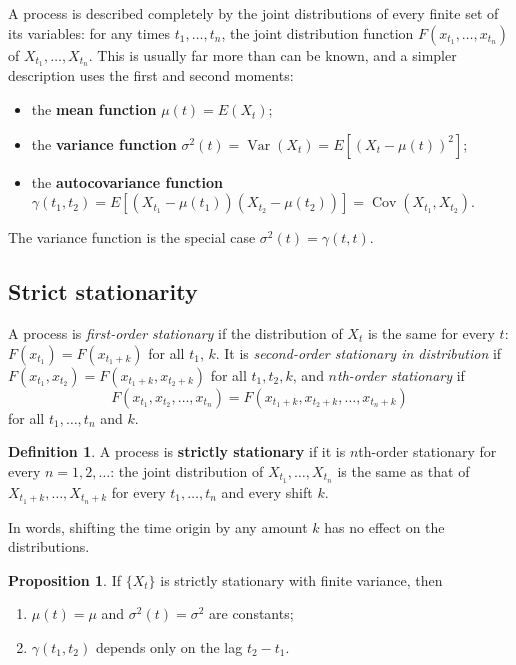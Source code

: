 \documentclass[11pt,a4paper]{article}
\theoremstyle{definition}
\newtheorem{defn}[thm]{Definition}
\newtheorem{prop}[thm]{Proposition}
\DeclareMathOperator{\Var}{Var}
\DeclareMathOperator{\Cov}{Cov}
\begin{document}
A process is described completely by the joint distributions of every finite set of its variables: for any
times $t_1, \dots, t_n$, the joint distribution function $F(x_{t_1}, \dots, x_{t_n})$ of $X_{t_1}, \dots, X_{t_n}$. This is usually far more than can be
known, and a simpler description uses the first and second moments:
\begin{itemize}
\item the \textbf{mean function} $\mu(t) = E(X_t)$;
\item the \textbf{variance function} $\sigma^2(t) = \Var(X_t) = E[(X_t - \mu(t))^2]$;
\item the \textbf{autocovariance function} $\gamma(t_1, t_2) = E[(X_{t_1} - \mu(t_1))(X_{t_2} - \mu(t_2))] = \Cov(X_{t_1}, X_{t_2})$.
\end{itemize}
The variance function is the special case $\sigma^2(t) = \gamma(t, t)$.

\subsection{Strict stationarity}
A process is \emph{first-order stationary} if the distribution of $X_t$ is the same for every $t$: $F(x_{t_1}) = F(x_{t_1+k})$ for all $t_1$, $k$. It is
\emph{second-order stationary in distribution} if $F(x_{t_1}, x_{t_2}) = F(x_{t_1+k}, x_{t_2+k})$ for all $t_1, t_2, k$, and \emph{$n$th-order stationary} if
\[
F(x_{t_1}, x_{t_2}, \dots, x_{t_n}) = F(x_{t_1+k}, x_{t_2+k}, \dots, x_{t_n+k})
\]
for all $t_1, \dots, t_n$ and $k$.

\begin{defn}
A process is \textbf{strictly stationary} if it is $n$th-order stationary for every $n = 1, 2, \dots$: the joint distribution of
$X_{t_1}, \dots, X_{t_n}$ is the same as that of $X_{t_1+k}, \dots, X_{t_n+k}$ for every $t_1, \dots, t_n$ and every shift $k$.
\end{defn}

In words, shifting the time origin by any amount $k$ has no effect on the distributions.

\begin{prop}\label{prop:strict-moments}
If $\{X_t\}$ is strictly stationary with finite variance, then
\begin{enumerate}[label=(\roman*)]
\item $\mu(t) = \mu$ and $\sigma^2(t) = \sigma^2$ are constants;
\item $\gamma(t_1, t_2)$ depends only on the lag $t_2 - t_1$.
\end{enumerate}
\end{prop}
\end{document}
